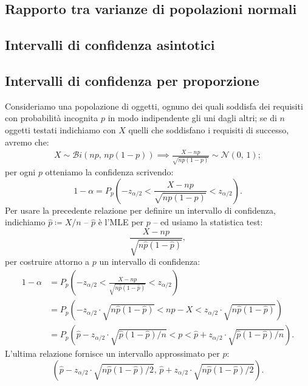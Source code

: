         \subsection{Rapporto tra varianze di popolazioni normali}
        \subsection{Intervalli di confidenza asintotici}
        \subsection{Intervalli di confidenza per proporzione}
            \begin{defn}
                Consideriamo una popolazione di oggetti, ognuno dei quali soddisfa dei requisiti con 
                probabilità incognita $p$ in modo indipendente gli uni dagli altri; se di $n$ oggetti 
                testati indichiamo con $X$ quelli che soddisfano i requisiti di successo, avremo che:
                \begin{align*}
                    X \sim \mathcal{B}i(np,\,np(1-p)) \implies
                    \frac{X - np}{\sqrt{np(1-p)}} \sim \mathcal{N}(0,\,1)
                ;\end{align*}
                per ogni $p$ otteniamo la confidenza scrivendo: \[
                    1-\alpha = P_{p}\left(-z_{\alpha /2} < \frac{X -np}{\sqrt{np(1-p)}} < z_{\alpha /2}\right)
                .\]
                Per usare la precedente relazione per definire un intervallo di confidenza, indichiamo 
                $\hat{p}\coloneqq X /n$ \--- $\hat{p}$ è l'MLE per $p$ \--- ed usiamo la statistica 
                test: \[
                    \frac{X -np}{\sqrt{n\hat{p}(1-\hat{p})}}
                ,\] per costruire attorno a $p$ un intervallo di confidenza:
                \begin{align*}
                    1-\alpha &= P_{p}\left(-z_{\alpha /2} < \frac{X -np}{\sqrt{n\hat{p}(1-\hat{p})}} < 
                    z_{\alpha /2}\right) \\
                    &= P_{p}\left(-z_{\alpha /2}\cdot \sqrt{n\hat{p}(1-\hat{p})} < 
                    np-X < z_{\alpha /2}\cdot \sqrt{n\hat{p}(1-\hat{p})}\right) \\
                    &= P_{p}\left(\hat{p}- z_{\alpha /2}\cdot \sqrt{\hat{p}(1-\hat{p}) /n} < 
                    p < \hat{p}+ z_{\alpha /2}\cdot \sqrt{\hat{p}(1-\hat{p}) /n}\right)
                .\end{align*}
                L'ultima relazione fornisce un intervallo approssimato per $p$: \[
                    \left(\hat{p}- z_{\alpha /2}\cdot \sqrt{n\hat{p}(1-\hat{p}) /2},\, 
                    \hat{p}+ z_{\alpha /2}\cdot \sqrt{n\hat{p}(1-\hat{p}) /2}\right)
                .\] 
            \end{defn}
